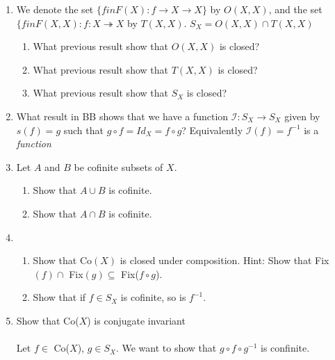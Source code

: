 \documentclass[11pt]{article}
\begin{document}
\begin{enumerate}
\newpage
\item We denote the set $\{f in F(X) : f \to X \to X\}$ by $O(X, X)$, and the set $\{f in F(X, X) : f : X \twoheadrightarrow X$ by $T(X, X)$.  $S_X = O(X,X) \cap T(X,X)$
\begin{enumerate}
\item What previous result show that $O(X, X)$ is closed?\\
\item What previous result show that $T(X, X)$ is closed?\\
\item What previous result show that $S_X$ is closed?\\
\end{enumerate}

\newpage
\item What result in BB shows that we have a function $\mathcal{I} : S_X \to S_X$ given by $s(f) = g$ such that $g \circ f = Id_X = f \circ g$? Equivalently $\mathcal{I}(f) = f^{-1}$ is a \emph{function}\\

\newpage
\item Let $A$ and $B$ be cofinite subsets of $X$.\\
\begin{enumerate}
\item Show that $A \cup B$ is cofinite.\\
\item Show that $A \cap B$ is cofinite.\\
\end{enumerate}

\newpage
\item
\begin{enumerate}
\item Show that Co$(X)$ is closed under composition.  Hint: Show that Fix$(f) \cap$ Fix$(g) \subseteq$ Fix($f \circ g$).
\item Show that if $f \in S_X$ is cofinite, so is $f^{-1}$.
\end{enumerate}

\newpage
\item Show that Co($X$) is conjugate invariant
\\
\\
Let $f \in $ Co($X$), $g \in S_X$.  We want to show that $g \circ f \circ g^{-1}$ is confinite.\\


\end{enumerate}
\end{document}
